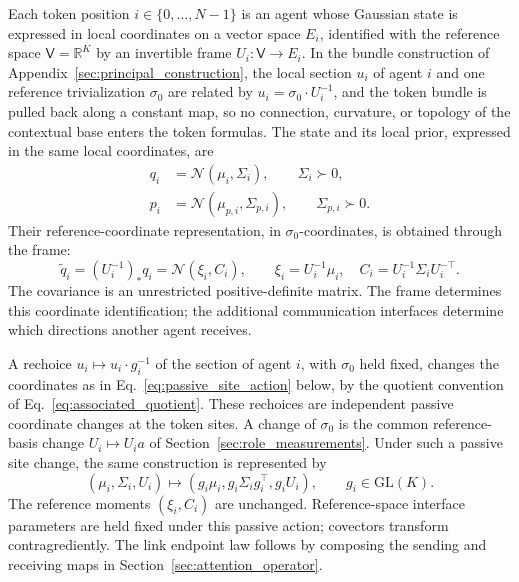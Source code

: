 \documentclass[twoside,11pt]{article}
\begin{document}
Each token position $i\in\{0,\ldots,N-1\}$ is an agent whose Gaussian state is expressed in local coordinates on a vector space $E_i$, identified with the reference space $\mathsf V=\mathbb R^K$ by an invertible frame $U_i:\mathsf V\to E_i$. In the bundle construction of Appendix~\ref{sec:principal_construction}, the local section $u_i$ of agent $i$ and one reference trivialization $\sigma_0$ are related by $u_i=\sigma_0\cdot U_i^{-1}$, and the token bundle is pulled back along a constant map, so no connection, curvature, or topology of the contextual base enters the token formulas.
The state and its local prior, expressed in the same local coordinates, are
\begin{align}
q_i&=\mathcal N(\mu_i,\Sigma_i),\qquad \Sigma_i\succ0,\label{eq:gaussian_states}\\
p_i&=\mathcal N(\mu_{p,i},\Sigma_{p,i}),\qquad \Sigma_{p,i}\succ0.\label{eq:base_priors}
\end{align}
Their reference-coordinate representation, in \(\sigma_0\)-coordinates, is obtained through the frame:
\begin{equation}
\widetilde q_i=(U_i^{-1})_*q_i
=\mathcal N(\xi_i,C_i),\qquad
\xi_i=U_i^{-1}\mu_i,\quad
C_i=U_i^{-1}\Sigma_iU_i^{-\top}.
\label{eq:overview_reference_state}
\end{equation}
The covariance is an unrestricted positive-definite matrix. The frame determines this coordinate identification; the additional communication interfaces determine which directions another agent receives.

A rechoice \(u_i\mapsto u_i\cdot g_i^{-1}\) of the section of agent \(i\), with \(\sigma_0\) held fixed, changes the coordinates as in Eq.~\eqref{eq:passive_site_action} below, by the quotient convention of Eq.~\eqref{eq:associated_quotient}. These rechoices are independent passive coordinate changes at the token sites. A change of \(\sigma_0\) is the common reference-basis change \(U_i\mapsto U_ia\) of Section~\ref{sec:role_measurements}. Under such a passive site change, the same construction is represented by
\begin{equation}
(\mu_i,\Sigma_i,U_i)\mapsto
(g_i\mu_i,g_i\Sigma_i g_i^\top,g_iU_i),
\qquad g_i\in\mathrm{GL}(K).
\label{eq:passive_site_action}
\end{equation}
The reference moments \((\xi_i,C_i)\) are unchanged. Reference-space interface parameters are held fixed under this passive action; covectors transform contragrediently. The link endpoint law follows by composing the sending and receiving maps in Section~\ref{sec:attention_operator}.
\end{document}
